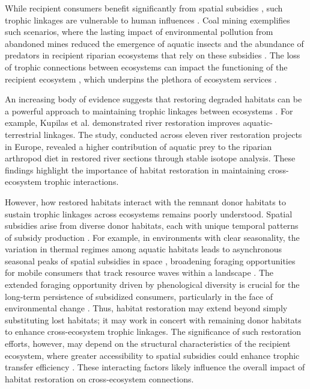 \documentclass[11pt, class=article, crop=false]{standalone}
\begin{document}
While recipient consumers benefit significantly from spatial subsidies \citep{nakano_reciprocal_2001, takimoto_seasonal_2002, terui_stream_2018}, such trophic linkages are vulnerable to human influences \citep{paetzold_environmental_2011, kraus_cross-ecosystem_2014, schulz_review_2015, tonra_barriers_2016}. 
Coal mining exemplifies such scenarios, where the lasting impact of environmental pollution from abandoned mines reduced the emergence of aquatic insects and the abundance of predators in recipient riparian ecosystems that rely on these subsidies \citep{paetzold_environmental_2011}.
The loss of trophic connections between ecosystems can impact the functioning of the recipient ecosystem \citep{sato_nematomorph_2012, sato_stage-specific_2014, terui_stream_2018}, which underpins the plethora of ecosystem services \citep{cardinale_biodiversity_2012}.

An increasing body of evidence suggests that restoring degraded habitats can be a powerful approach to maintaining trophic linkages between ecosystems \citep{buckner_conserving_2018, kupilas_stable_2020}.
For example, Kupilas et al. \citeyearpar{kupilas_stable_2020} demonstrated river restoration improves aquatic-terrestrial linkages.
The study, conducted across eleven river restoration projects in Europe, revealed a higher contribution of aquatic prey to the riparian arthropod diet in restored river sections through stable isotope analysis.
These findings highlight the importance of habitat restoration in maintaining cross-ecosystem trophic interactions.

However, how restored habitats interact with the remnant donor habitats to sustain trophic linkages across ecosystems remains poorly understood.
Spatial subsidies arise from diverse donor habitats, each with unique temporal patterns of subsidy production \citep{schindler_portfolio_2015, schindler_subsidies_2017}.
For example, in environments with clear seasonality, the variation in thermal regimes among aquatic habitats leads to asynchronous seasonal peaks of spatial subsidies in space \citep{nash_latitudinal_2023}, broadening foraging opportunities for mobile consumers that track resource waves within a landscape \citep{schindler_riding_2013, ruff_temperature-associated_2011, armstrong_resource_2016}.
The extended foraging opportunity driven by phenological diversity is crucial for the long-term persistence of subsidized consumers, particularly in the face of environmental change \citep{fryxell_landscape_2005, armstrong_watershed_2020}.
Thus, habitat restoration may extend beyond simply substituting lost habitats; it may work in concert with remaining donor habitats to enhance cross-ecosystem trophic linkages.
The significance of such restoration efforts, however, may depend on the structural characteristics of the recipient ecosystem, where greater accessibility to spatial subsidies could enhance trophic transfer efficiency \citep{marczak_meta-analysis_2007, terui_species-specific_2017}.
These interacting factors likely influence the overall impact of habitat restoration on cross-ecosystem connections.
\end{document}
